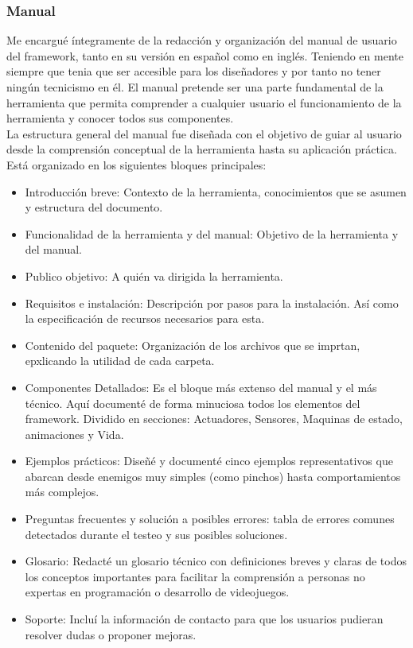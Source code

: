 \subsubsection{Manual}
Me encargué íntegramente de la redacción y organización del manual de usuario del framework, tanto en su versión en español como en inglés. Teniendo en mente siempre que tenia que ser accesible para los diseñadores y por tanto no tener ningún tecnicismo en él. El manual pretende ser una parte fundamental de la herramienta que permita comprender a cualquier usuario el funcionamiento de la herramienta y conocer todos sus componentes. \\
La estructura general del manual fue diseñada con el objetivo de guiar al usuario desde la comprensión conceptual de la herramienta hasta su aplicación práctica. Está organizado en los siguientes bloques principales:
 \begin{itemize}
    \item Introducción breve: Contexto de la herramienta, conocimientos que se asumen y estructura del documento.
    \item Funcionalidad de la herramienta y del manual:  Objetivo de la herramienta y del manual.
    \item Publico objetivo: A quién va dirigida la herramienta.
    \item Requisitos e instalación: Descripción por pasos para la instalación. Así como la especificación de recursos necesarios  para esta.
    \item Contenido del paquete: Organización de los archivos que se imprtan, epxlicando la utilidad de cada carpeta.
    \item Componentes Detallados: Es el bloque más extenso del manual y el más técnico. Aquí documenté de forma minuciosa todos los elementos del framework. Dividido en secciones: Actuadores, Sensores, Maquinas de estado, animaciones y Vida.
    \item Ejemplos prácticos: Diseñé y documenté cinco ejemplos representativos que abarcan desde enemigos muy simples (como pinchos) hasta comportamientos más complejos.
    \item Preguntas frecuentes y solución a posibles errores: tabla de errores comunes detectados durante el testeo y sus posibles soluciones.
    \item Glosario: Redacté un glosario técnico con definiciones breves y claras de todos los conceptos importantes para facilitar la comprensión a personas no expertas en programación o desarrollo de videojuegos.
    \item Soporte: Incluí la información de contacto para que los usuarios pudieran resolver dudas o proponer mejoras.
  \end{itemize}


